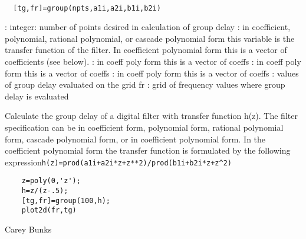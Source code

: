 
\begin{mandesc}
   \\ %
\end{mandesc}
\begin{calling_sequence}
\begin{verbatim}
  [tg,fr]=group(npts,a1i,a2i,b1i,b2i)  
\end{verbatim}
\end{calling_sequence}
\begin{parameters}
  \begin{varlist}
    : integer: number of points desired in calculation of group delay
    : in coefficient, polynomial, rational polynomial, or cascade polynomial form this variable is the transfer function of the filter. In coefficient polynomial form this is a vector of coefficients (see below).
    : in coeff poly form this is a vector of coeffs
    : in coeff poly form this is a vector of coeffs
    : in coeff poly form this is a vector of coeffs
    : values of group delay evaluated on the grid fr
    : grid of frequency values where group delay is evaluated
  \end{varlist}
\end{parameters}
\begin{mandescription}
  Calculate the group delay of a digital filter
  with transfer function h(z).
  The filter specification can be in coefficient form,
  polynomial form, rational polynomial form, cascade
  polynomial form, or in coefficient polynomial form.
  In the coefficient polynomial form the transfer function is
  formulated by the following expression\verb!h(z)=prod(a1i+a2i*z+z**2)/prod(b1i+b2i*z+z^2)!
\end{mandescription}
\begin{examples}
  \begin{Verbatim}
    z=poly(0,'z');
    h=z/(z-.5);
    [tg,fr]=group(100,h);
    plot2d(fr,tg)
  \end{Verbatim}
\end{examples}
\begin{authors}
    Carey Bunks  
\end{authors}
